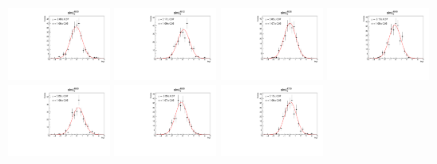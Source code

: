 \begin{figure}[h]\centering
    \includegraphics[width=0.24\textwidth]{figure/io_full_sim/polarization/pull_polarization_delta0_4600.pdf}
    \includegraphics[width=0.24\textwidth]{figure/io_full_sim/polarization/pull_polarization_delta0_4612.pdf}
    \includegraphics[width=0.24\textwidth]{figure/io_full_sim/polarization/pull_polarization_delta0_4626.pdf}
    \includegraphics[width=0.24\textwidth]{figure/io_full_sim/polarization/pull_polarization_delta0_4640.pdf}
    \includegraphics[width=0.24\textwidth]{figure/io_full_sim/polarization/pull_polarization_delta0_4660.pdf}
    \includegraphics[width=0.24\textwidth]{figure/io_full_sim/polarization/pull_polarization_delta0_4680.pdf}
    \includegraphics[width=0.24\textwidth]{figure/io_full_sim/polarization/pull_polarization_delta0_4700.pdf}

\end{figure}
